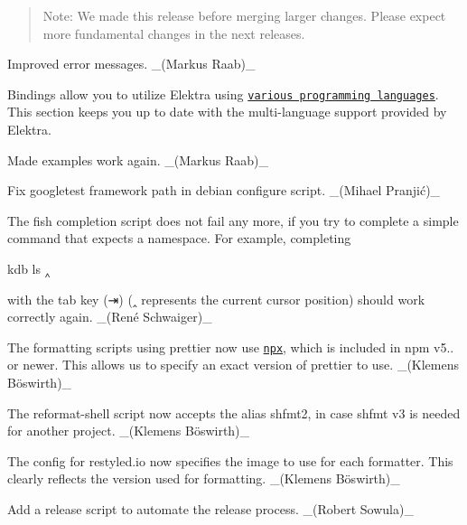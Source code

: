 \begin{quote}
Note\+: We made this release before merging larger changes. Please expect more fundamental changes in the next releases. \end{quote}



\begin{DoxyItemize}
\item Improved error messages. \+\_\+(\+Markus Raab)\+\_\+
\end{DoxyItemize}

Bindings allow you to utilize Elektra using \href{https://www.libelektra.org/bindings/readme}{\tt various programming languages}. This section keeps you up to date with the multi-\/language support provided by Elektra.


\begin{DoxyItemize}
\item Made examples work again. \+\_\+(\+Markus Raab)\+\_\+
\end{DoxyItemize}


\begin{DoxyItemize}
\item Fix googletest framework path in debian configure script. \+\_\+(Mihael Pranjić)\+\_\+
\item The fish completion script does not fail any more, if you try to complete a simple command that expects a namespace. For example, completing
\end{DoxyItemize}


\begin{DoxyCode}
kdb ls ‸
\end{DoxyCode}


with the tab key ({\ttfamily ⇥}) ({\ttfamily ‸} represents the current cursor position) should work correctly again. \+\_\+(René Schwaiger)\+\_\+


\begin{DoxyItemize}
\item The formatting scripts using prettier now use \href{https://www.npmjs.com/package/npx}{\tt {\ttfamily npx}}, which is included in {\ttfamily npm} v5.. or newer. This allows us to specify an exact version of prettier to use. \+\_\+(Klemens Böswirth)\+\_\+
\item The {\ttfamily reformat-\/shell} script now accepts the alias {\ttfamily shfmt2}, in case {\ttfamily shfmt} v3 is needed for another project. \+\_\+(Klemens Böswirth)\+\_\+
\item The config for restyled.\+io now specifies the image to use for each formatter. This clearly reflects the version used for formatting. \+\_\+(Klemens Böswirth)\+\_\+
\item Add a release script to automate the release process. \+\_\+(\+Robert Sowula)\+\_\+
\end{DoxyItemize}


